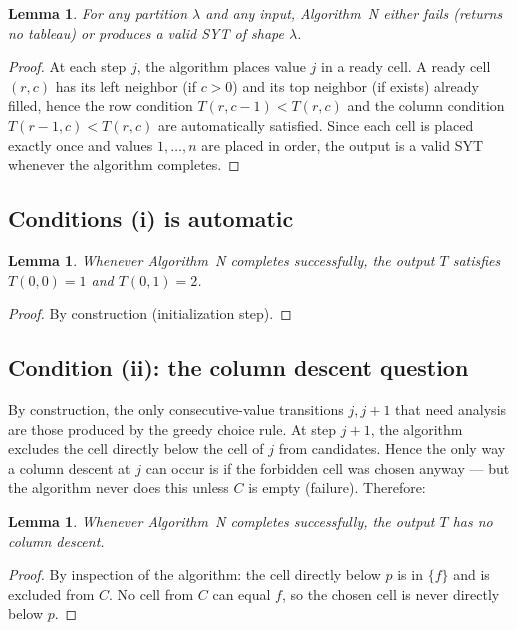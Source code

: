 \documentclass[11pt]{article}
\newtheorem{lemma}[theorem]{Lemma}
\theoremstyle{definition}
\begin{document}
\begin{lemma}\label{lem:syt-valid}
For any partition $\lambda$ and any input, Algorithm~N either fails
(returns no tableau) or produces a valid SYT of shape $\lambda$.
\end{lemma}

\begin{proof}
At each step $j$, the algorithm places value $j$ in a ready cell.  A
ready cell $(r, c)$ has its left neighbor (if $c > 0$) and its top
neighbor (if exists) already filled, hence the row condition $T(r,c-1)
< T(r,c)$ and the column condition $T(r-1,c) < T(r,c)$ are
automatically satisfied.  Since each cell is placed exactly once and
values $1, \ldots, n$ are placed in order, the output is a valid SYT
whenever the algorithm completes.
\end{proof}

\subsection{Conditions (i) is automatic}

\begin{lemma}\label{lem:i-auto}
Whenever Algorithm~N completes successfully, the output $T$ satisfies
$T(0,0) = 1$ and $T(0,1) = 2$.
\end{lemma}

\begin{proof}
By construction (initialization step).
\end{proof}

\subsection{Condition (ii): the column descent question}

By construction, the only consecutive-value transitions $j, j+1$ that
need analysis are those produced by the greedy choice rule.  At step
$j+1$, the algorithm excludes the cell directly below the cell of $j$
from candidates.  Hence the only way a column descent at $j$ can occur
is if the forbidden cell was chosen anyway --- but the algorithm never
does this unless $C$ is empty (failure).  Therefore:

\begin{lemma}\label{lem:no-descent}
Whenever Algorithm~N completes successfully, the output $T$ has no
column descent.
\end{lemma}

\begin{proof}
By inspection of the algorithm: the cell directly below $p$ is in
$\{f\}$ and is excluded from $C$.  No cell from $C$ can equal $f$, so
the chosen cell is never directly below $p$.
\end{proof}
\end{document}
